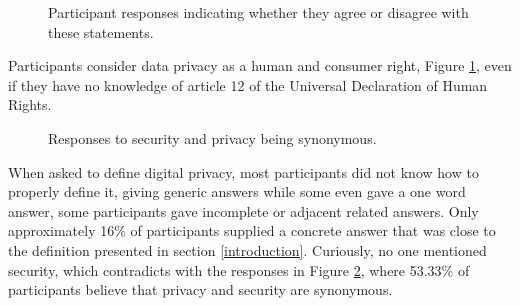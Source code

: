 \begin{figure}
    \begin{center}
        \caption{Participant responses indicating whether they agree or disagree with these statements.}
        \label{fig:privacy_human_right_histogram}
    \end{center}
\end{figure}

Participants consider data privacy as a human and consumer right, Figure \ref*{fig:privacy_human_right_histogram},
even if they have no knowledge of article 12 of the Universal Declaration of Human Rights.

\begin{figure}
    \centering
    \caption{Responses to security and privacy being synonymous.}
    \label{fig:security_equals_privacy}
\end{figure}

When asked to define digital privacy, most participants did not know
how to properly define it, giving generic answers while some even gave a one word answer,
some participants gave incomplete or adjacent related answers. Only approximately
16\% of participants supplied a concrete answer that was close to the definition
presented in section \ref{introduction}. Curiously, no one mentioned security,
which contradicts with the responses in Figure \ref*{fig:security_equals_privacy},
where 53.33\% of participants believe that privacy and security are synonymous.

